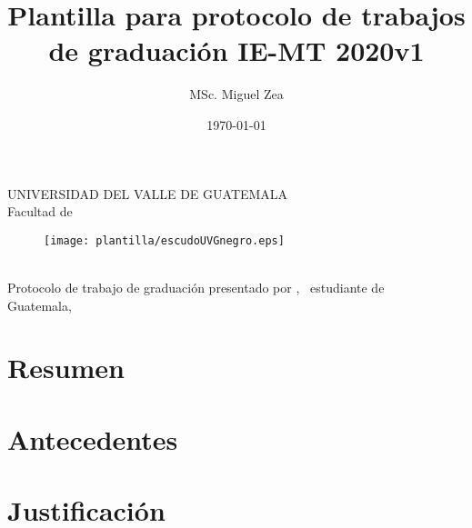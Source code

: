 \documentclass[11pt, letterpaper, twoside, openright]{report}
\title{Plantilla para protocolo de trabajos de graduación IE-MT 2020v1}
\author{MSc. Miguel Zea}
\date{\today}
\newcommand{\defaultparformat}[1]{
	{\setlength{\parskip}{2ex}
     }
}
\begin{document}
\graphicspath{{figuras/}}


\newpage
\cleardoublepage{}
\pagecolor{white}
\color{black}
\setcounter{page}{1}
\thispagestyle{empty}
\begin{center}
	\LARGE UNIVERSIDAD DEL VALLE DE GUATEMALA\\
	\LARGE Facultad de \uvgfacultad \\[0.75cm]
\end{center}
\begin{figure}[h]
	\begin{center}
	\texttt{[image: plantilla/escudoUVGnegro.eps]}
	\vspace{0.5in}
	\end{center}
\end{figure}
\begin{center}
	\Large \textbf{\nohyphens{\titulotesis}} \\
	\vfill
	\Large \nohyphens{Protocolo de trabajo de graduación presentado por \nombreestudiante, \ estudiante de \uvgcarrera} \\
	\vfill
	\large Guatemala, \\
	\vspace{1em}
	\anoentrega
\end{center}


\pagestyle{plain}

\newpage
\cleardoublepage
{}
\setcounter{page}{1}

\section*{Resumen}
\defaultparformat{b-resumen}

\section*{Antecedentes}
\defaultparformat{e-antecedentes}

\section*{Justificación}
\defaultparformat{f-justificacion}
\end{document}
